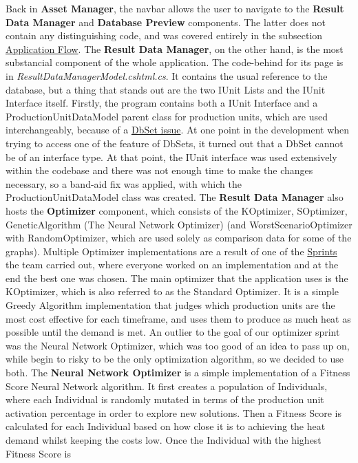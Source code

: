 \documentclass[12pt]{report}
\begin{document}
Back in \textbf{Asset Manager}, the navbar allows the user to navigate to the \textbf{Result Data Manager} and \textbf{Database Preview}
components. The latter does not contain any distinguishing code, and was covered entirely in the subsection \hyperref[sec:appflow]{Application Flow}.
The \textbf{Result Data Manager}, on the other hand, is the most substancial component of the whole application. The code-behind for its page
is in \textit{ResultDataManagerModel.cshtml.cs}. It contains the usual reference to the database, but a thing that stands out
are the two IUnit Lists and the IUnit Interface itself. Firstly, the program contains both a IUnit Interface and a ProductionUnitDataModel parent class
for production units, which are used interchangeably, because of a \underline{DbSet issue}. At one point in the development
when trying to access one of the feature of DbSets, it turned out that a DbSet cannot be of an interface type. At that point, the IUnit
interface was used extensively within the codebase and there was not enough time to make the changes necessary, so a band-aid fix was applied, with which
the ProductionUnitDataModel class was created. The \textbf{Result Data Manager} also hosts the \textbf{Optimizer}
component, which consists of the KOptimizer, SOptimizer, GeneticAlgorithm (The Neural Network Optimizer) (and WorstScenarioOptimizer with RandomOptimizer, which
are used solely as comparison data for some of the graphs). Multiple Optimizer implementations are a result of one of the
\hyperref[sec:sprints]{Sprints} the team carried out, where everyone worked on an implementation and at the end the best one was chosen.
The main optimizer that the application uses is the KOptimizer, which is also referred to as the Standard Optimizer. It is a simple
Greedy Algorithm implementation that judges which production units are the most cost effective for each timeframe, and uses 
them to produce as much heat as possible until the demand is met. An outlier to the goal of our optimizer sprint was the Neural Network Optimizer,
which was too good of an idea to pass up on, while begin to risky to be the only optimization algorithm, so we decided to use both.
The \textbf{Neural Network Optimizer} is a simple implementation of a Fitness Score Neural Network algorithm. It first creates a population of Individuals, where
each Individual is randomly mutated in terms of the production unit activation percentage in order to explore new solutions. Then a Fitness Score is calculated 
for each Individual based on how close it is to achieving the heat demand whilst keeping the costs low. Once the Individual with the highest Fitness Score is
\end{document}
